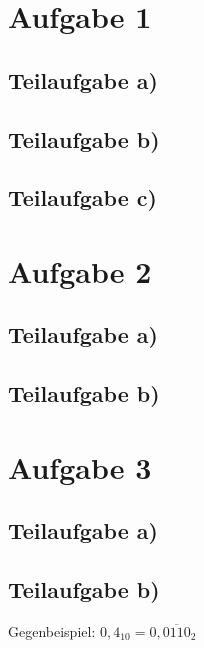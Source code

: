 \documentclass{llncs}
\begin{document}
\section*{Aufgabe 1}

\subsection*{Teilaufgabe a)}
\subsection*{Teilaufgabe b)}
\subsection*{Teilaufgabe c)}

\section*{Aufgabe 2}
\subsection*{Teilaufgabe a)}
\subsection*{Teilaufgabe b)}


\section*{Aufgabe 3}

\subsection*{Teilaufgabe a)}


\subsection*{Teilaufgabe b)}

Gegenbeispiel: $0,4_{10} = 0,\overline{0110}_2$
\end{document}
